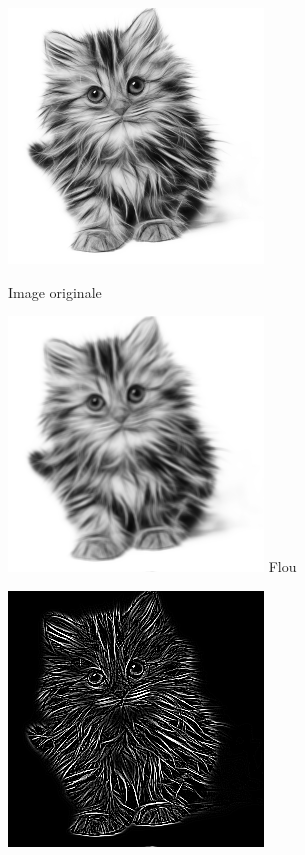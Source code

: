 \documentclass[11pt,class=report,crop=false]{standalone}
\begin{document}
\begin{activite}
	
	
\begin{center}
	\begin{minipage}{0.18\textwidth}\center
		\includegraphics[scale=\myscale,scale=0.3]{png/chat}
		
		Image originale
	\end{minipage}
	\begin{minipage}{0.18\textwidth}\center
		\includegraphics[scale=\myscale,scale=0.3]{png/chat_conv_flou}
		\newline Flou
	\end{minipage}
	\begin{minipage}{0.18\textwidth}\center
		\includegraphics[scale=\myscale,scale=0.3]{png/chat_conv_bord}
		

\end{minipage}
\end{center}
\end{activite}
\end{document}
